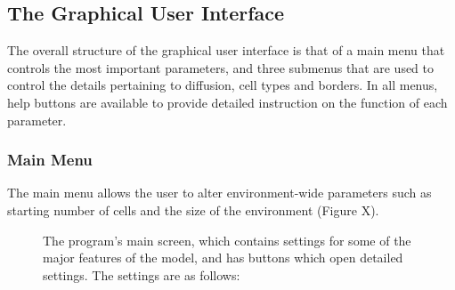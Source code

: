 \documentclass[12pt]{article}
\begin{document}
\subsection{The Graphical User Interface}
The overall structure of the graphical user interface is that of a main 
menu that controls the most important parameters, and three submenus 
that are used to control the details pertaining to diffusion, cell types 
and borders. In all menus, help buttons are available to provide 
detailed instruction on the function of each parameter.

\subsubsection{Main Menu}

The main menu allows the user to alter environment-wide parameters such 
as starting number of cells and the size of the environment (Figure X). 

\begin{figure}[H]
\centering
\caption{The program's main screen, which contains settings 
for some of the major features of the model, and has buttons which open 
detailed settings. The settings are as follows:}
\end{figure}
\end{document}
